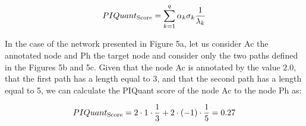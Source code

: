 \documentclass[11pt]{bmc_article_s50}
\newenvironment{bmcformat}{\begin{raggedright}\baselineskip20pt\sloppy\setboolean{publ}{false}}{\end{raggedright}\baselineskip20pt\sloppy}
\begin{document}
\begin{bmcformat}
$$
 PIQuant_{\textnormal{Score}} = \sum_{k=1}^{q} \alpha_{k} \sigma_{k} \frac{1}{\lambda_{k}}
$$

In the case of the network presented in Figure 5a, let us
consider Ac the annotated node and Ph the target node and consider only the two
paths defined in the Figures 5b and
5c. Given that the
node Ac is annotated by the value $2.0$, that the first path has a length
equal to 3, and that the second path has a length equal to 5, we can calculate the PIQuant score
of the node Ac to the node Ph as:

$$
 PIQuant_{\textnormal{Score}} = 2 \cdot 1 \cdot \frac{1}{3} + 2 \cdot (-1) \cdot \frac{1}{5}
= 0.27
$$


%
%
%
%
%


\end{bmcformat}
\end{document}
